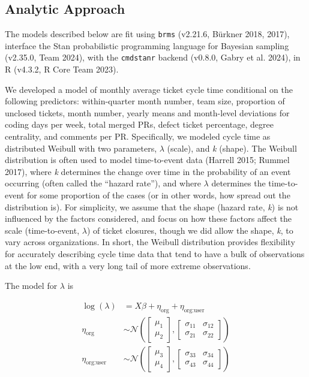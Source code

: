\documentclass[
]{article}
\begin{document}
\subsection{Analytic Approach}\label{analytic-approach}

The models described below are fit using \texttt{brms} (v2.21.6, Bürkner
2018, 2017), interface the Stan probabilistic programming language for
Bayesian sampling (v2.35.0, Team 2024), with the \texttt{cmdstanr}
backend (v0.8.0, Gabry et al. 2024), in R (v4.3.2, R Core Team 2023).

We developed a model of monthly average ticket cycle time conditional on
the following predictors: within-quarter month number, team size,
proportion of unclosed tickets, month number, yearly means and
month-level deviations for coding days per week, total merged PRs,
defect ticket percentage, degree centrality, and comments per PR.
Specifically, we modeled cycle time as distributed Weibull with two
parameters, \(\lambda\) (scale), and \emph{k} (shape). The Weibull
distribution is often used to model time-to-event data (Harrell 2015;
Rummel 2017), where \emph{k} determines the change over time in the
probability of an event occurring (often called the ``hazard rate''),
and where \(\lambda\) determines the time-to-event for some proportion
of the cases (or in other words, how spread out the distribution is).
For simplicity, we assume that the shape (hazard rate, \emph{k}) is not
influenced by the factors considered, and focus on how these factors
affect the scale (time-to-event, \(\lambda\)) of ticket closures, though
we did allow the shape, \emph{k}, to vary across organizations. In
short, the Weibull distribution provides flexibility for accurately
describing cycle time data that tend to have a bulk of observations at
the low end, with a very long tail of more extreme observations.

The model for \(\lambda\) is

\begin{equation}
\begin{aligned}
\log(\lambda) &= X\beta + \eta_{\text{org}} + \eta_{\text{org:user}} \\
\eta_{\text{org}} &\sim \mathcal{N}\left(\begin{bmatrix} \mu_1 \\ \mu_2 \end{bmatrix}, \begin{bmatrix} \sigma_{11} & \sigma_{12} \\ \sigma_{21} & \sigma_{22} \end{bmatrix}\right) \\
\eta_{\text{org:user}} &\sim \mathcal{N}\left(\begin{bmatrix} \mu_3 \\ \mu_4 \end{bmatrix}, \begin{bmatrix} \sigma_{33} & \sigma_{34} \\ \sigma_{43} & \sigma_{44} \end{bmatrix}\right) 
\end{aligned}
\end{equation}
\end{document}
